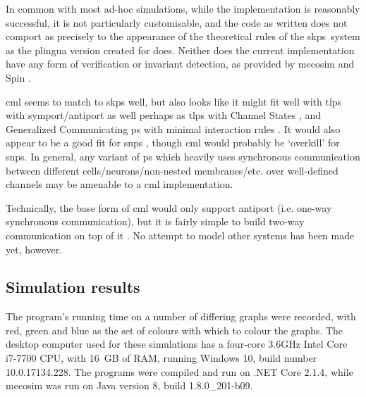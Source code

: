 In common with most ad-hoc simulations, while the implementation is reasonably successful, it is not particularly customisable, and the code as written does not comport as precisely to the appearance of the theoretical rules of the \gls{skps}~system as the \gls{plingua} version created for \cite{Gheorghe2013} does.  Neither does the current implementation have any form of verification or invariant detection, as provided by \gls{mecosim} \cite{Perez-Hurtado2010} and Spin \cite{Ben-Ari2008,Lefticaru2011}.%

\gls{cml} seems to match to \gls{skps} well, but also looks like it might fit well with \gls{tlps} with symport/antiport \cite{Verlan2005} as well perhaps as \gls{tlps} with Channel States \cite{Song2016}, and Generalized Communicating \gls{ps} with minimal interaction rules \cite{Csuhaj-Varju2011}.  It would also appear to be a good fit for \gls{snps} \cite{Ionescu2006}, though \gls{cml} would probably be `overkill' for \gls{snps}.  In general, any variant of \gls{ps} which heavily uses synchronous communication between different cells/neurons/non-nested membranes/etc. over well-defined channels may be amenable to a \gls{cml} implementation.

Technically, the base form of \gls{cml} would only support antiport (i.e. one-way synchronous communication), but it is fairly simple to build two-way communication on top of it \cite[ch.~6]{Reppy2007}.  No attempt to model other systems has been made yet, however.

\subsection{Simulation results}
The program's running time on a number of differing graphs were recorded, with red, green and blue as the set of colours with which to colour the graphs.  The desktop computer used for these simulations has a four-core 3.6GHz Intel Core i7-7700 CPU, with 16 GB of RAM, running Windows 10, build number 10.0.17134.228.  The \fsharp{} programs were compiled and run on .NET Core 2.1.4, while \gls{mecosim} was run on Java version 8, build 1.8.0\_201-b09. 


